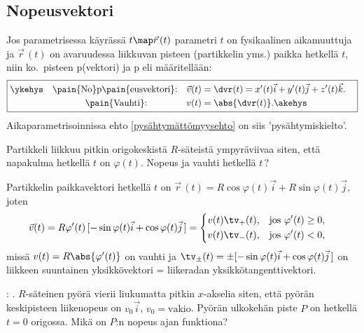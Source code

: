 \subsection{Nopeusvektori}

Jos parametrisessa käyrässä $t \map \vec r\,(t)$ parametri $t$ on fysikaalinen aikamuuttuja ja 
$\vec r\,(t)$ on avaruudessa liikkuvan pisteen (partikkelin yms.) paikka hetkellä $t$, niin
ko.\ pisteen p(vektori) ja p eli  
määritellään:
\[ \boxed{\begin{aligned} 
  \ykehys\quad \text{\pain{No}p\pain{eusvektori}:} \quad   
           &\vec v(t) = \dvr(t) = x'(t)\vec i + y'(t)\vec j + z'(t)\vec k. \quad \\
  \text{\pain{Vauhti}:} \quad\quad\quad\quad\ 
           &v(t) = \abs{\dvr(t)}. \akehys
          \end{aligned} } \]
Aikaparametrisoinnissa ehto \eqref{pysähtymättömyysehto} on siis 'pysähtymiskielto'.
\begin{Exa} \label{ympyräliike} Partikkeli liikkuu pitkin origokeskistä $R$-säteistä 
ympyräviivaa siten, että napakulma hetkellä $t$ on $\varphi(t)$. Nopeus ja vauhti hetkellä 
$t$\,? 
\end{Exa}
\ratk Partikkelin paikkavektori hetkellä $t$ on 
$\vec r\,(t) = R\cos\varphi(t)\vec i + R\sin\varphi(t)\vec j$, joten
\[ 
\vec v(t) = R\varphi'(t)\,[-\sin\varphi(t)\vec i + \cos\varphi(t)\vec j\,] 
          = \begin{cases} \begin{aligned} 
            v(t)\tv_+(t), \quad &\text{jos}\ \varphi'(t) \ge 0, \\
            v(t)\tv_-(t), \quad &\text{jos}\ \varphi'(t) < 0,
            \end{aligned} \end{cases} 
\]
missä $v(t) = R\abs{\varphi'(t)}$ on vauhti ja 
$\tv_\pm(t) = \pm[-\sin\varphi(t)\vec i + \cos\varphi(t)\vec j\,]$ on liikkeen suuntainen
yksikkövektori = liikeradan yksikkötangenttivektori. \loppu
\begin{Exa}: .  
$R$-säteinen pyörä vierii liukumatta pitkin $x$-akselia siten, että pyörän keskipisteen
liikenopeus on $v_0\vec i$, $v_0=\text{vakio}$. Pyörän ulkokehän piste $P$ on hetkellä $t=0$
origossa. Mikä on $P$:n nopeus ajan funktiona?
\end{Exa}
\ratk 
